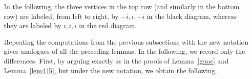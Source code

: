 \documentclass[a4,10pt]{amsart}
\numberwithin{equation}{section}
\theoremstyle{definition}
\begin{document}

In the following,  the three vertices in the top row (and similarly in the bottom row) are labeled, from left to right, by $ -i, i, -i$ in the black diagram, whereas they are labeled by $ i, i, i $ in the red diagram.
 

Repeating the computations from  the previous subsections with the new notation gives  analogues of all the preceding lemmas. In the following, we record only the differences. First, by arguing exactly as in the proofs of Lemma~\ref{guoc} and Lemma~\ref{lem415}, but under the new notation, we obtain the following.
 
\end{document}
